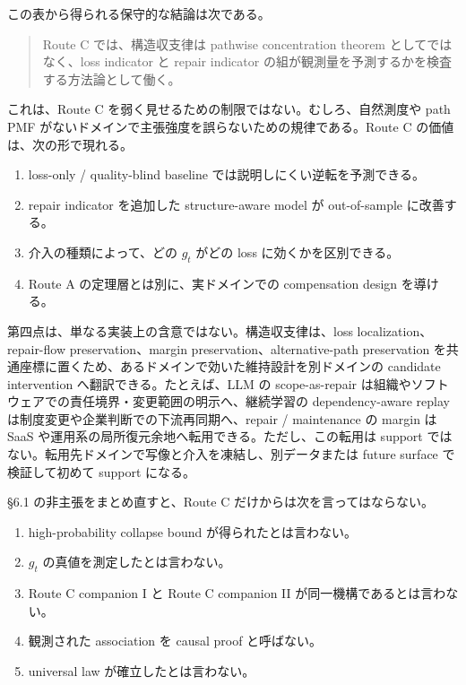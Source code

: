 \documentclass[12pt,a4paper]{article}
\begin{document}
この表から得られる保守的な結論は次である。

\begin{quote}
Route C では、構造収支律は pathwise concentration theorem としてではなく、loss indicator と repair indicator の組が観測量を予測するかを検査する方法論として働く。
\end{quote}

これは、Route C を弱く見せるための制限ではない。むしろ、自然測度や path PMF がないドメインで主張強度を誤らないための規律である。Route C の価値は、次の形で現れる。

\begin{enumerate}
\def\labelenumi{\arabic{enumi}.}
\tightlist
\item
  loss-only / quality-blind baseline では説明しにくい逆転を予測できる。
\item
  repair indicator を追加した structure-aware model が out-of-sample に改善する。
\item
  介入の種類によって、どの \(g_{t}\) がどの loss に効くかを区別できる。
\item
  Route A の定理層とは別に、実ドメインでの compensation design を導ける。
\end{enumerate}

第四点は、単なる実装上の含意ではない。構造収支律は、loss localization、repair-flow preservation、margin preservation、alternative-path preservation を共通座標に置くため、あるドメインで効いた維持設計を別ドメインの candidate intervention へ翻訳できる。たとえば、LLM の scope-as-repair は組織やソフトウェアでの責任境界・変更範囲の明示へ、継続学習の dependency-aware replay は制度変更や企業判断での下流再同期へ、repair / maintenance の margin は SaaS や運用系の局所復元余地へ転用できる。ただし、この転用は support ではない。転用先ドメインで写像と介入を凍結し、別データまたは future surface で検証して初めて support になる。

§6.1 の非主張をまとめ直すと、Route C だけからは次を言ってはならない。

\begin{enumerate}
\def\labelenumi{\arabic{enumi}.}
\tightlist
\item
  high-probability collapse bound が得られたとは言わない。
\item
  \(g_{t}\) の真値を測定したとは言わない。
\item
  Route C companion I と Route C companion II が同一機構であるとは言わない。
\item
  観測された association を causal proof と呼ばない。
\item
  universal law が確立したとは言わない。
\end{enumerate}
\end{document}
